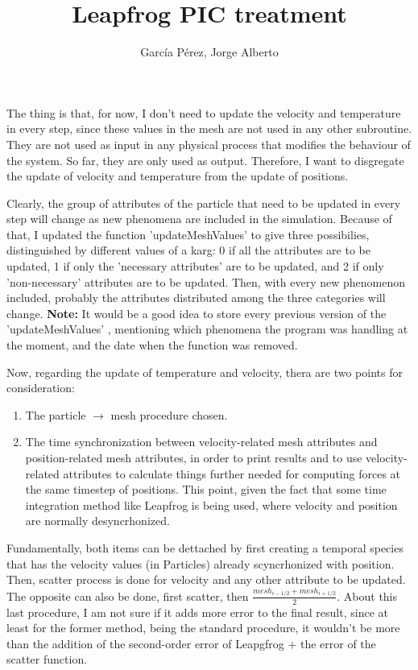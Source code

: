 \documentclass[reprint,aps]{revtex4-1}
\begin{document}
\title{Leapfrog PIC treatment}

\author{García Pérez, Jorge Alberto} 


\maketitle

The thing is that, for now, I don't need to update the velocity and temperature in every step, since these values in the mesh are not used in any other subroutine. They are not used as input in any physical process that modifies the behaviour of the system. So far, they are only used as output. Therefore, I want to disgregate the update of velocity and temperature from the update of positions.

Clearly, the group of attributes of the particle that need to be updated in every step will change as new phenomena are included in the simulation. Because of that, I updated the function 'updateMeshValues' to give three possibilies, distinguished by different values of a karg: 0 if all the attributes are to be updated, 1 if only the 'necessary attributes' are to be updated, and 2 if only 'non-necessary' attributes are to be updated. Then, with every new phenomenon included, probably the attributes distributed among the three categories will change. \textbf{Note:} It would be a good idea to store every previous version of the 'updateMeshValues' , mentioning which phenomena the program was handling at the moment, and the date when the function was removed.

Now, regarding the update of temperature and velocity, thera are two points for consideration:
\begin{enumerate}
\item The particle $\rightarrow$ mesh procedure chosen.
\item The time synchronization between velocity-related mesh attributes and position-related mesh attributes, in order to print results and to use velocity-related attributes to calculate things further needed for computing forces at the same timestep of positions. This point, given the fact that some time integration method like Leapfrog is being used, where velocity and position are normally desyncrhonized.
\end{enumerate}

Fundamentally, both items can be dettached by first creating a temporal species that has the velocity values (in Particles) already scyncrhonized with position. Then, scatter process is done for velocity and any other attribute to be updated. The opposite can also be done, first scatter, then $\frac{mesh_{i-1/2}+mesh_{i+1/2}}{2}$. About this last procedure, I am not sure if it adds more error to the final result, since at least for the former method, being the standard procedure, it wouldn't be more than the addition of the second-order error of Leapgfrog $+$ the error of the scatter function.
\end{document}
